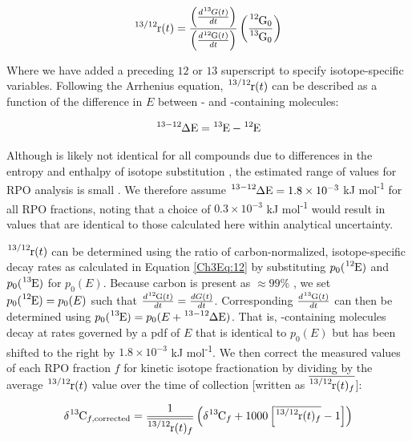 \begin{equation}\label{Ch3Eq:24}
	\ce{^{13/12}r}(t) = \frac{\left( \frac{d \ce{^{13}}G(t)}{dt} \right)}{\left( \frac{d \ce{^{12}G}(t)}{dt} \right)} \left( \frac{\ce{^{12}G}_0}{\ce{^{13}G}_0} \right)
\end{equation}

Where we have added a preceding $12$ or $13$ superscript to specify isotope-specific variables. Following the Arrhenius equation, $\ce{^{13/12}r}(t)$ can be described as a function of the difference in $E$ between - and -containing molecules:

\begin{equation}\label{Ch3Eq:25}
	\ce{^{13-12}\Delta E} = \ce{^{13}E} - \ce{^{12}E}
\end{equation}

Although  is likely not identical for all compounds due to differences in the entropy and enthalpy of isotope substitution \citep{Tang:2000ua}, the estimated range of values for RPO analysis is small \citep[$0.3 - 1.8 \times 10^{-3}$ kJ mol\textsuperscript{-1};][]{Hemingway:2016rc}. We therefore assume $\ce{^{13-12}\Delta E} = 1.8 \times 10^{-3}$ kJ mol\textsuperscript{-1} for all RPO fractions, noting that a choice of $0.3 \times 10^{-3}$ kJ mol\textsuperscript{-1} would result in  values that are identical to those calculated here within analytical uncertainty.

$\ce{^{13/12}r}(t)$ can be determined using the ratio of carbon-normalized, isotope-specific decay rates as calculated in Equation \ref{Ch3Eq:12} by substituting $p_{0}(\ce{^{12}E})$ and $p_{0}(\ce{^{13}E})$ for $p_{0}(E)$. Because carbon is present as $\approx 99$\% , we set $p_{0}(\ce{^{12}E}) = p_{0}(E)$ such that $\frac{d \ce{^{12}G}(t)}{dt} = \frac{dG(t)}{dt}$. Corresponding $\frac{d \ce{^{13}G}(t)}{dt}$ can then be determined using $p_{0}(\ce{^{13}E}) = p_{0}(E + \ce{^{13-12}\Delta E})$. That is, -containing molecules decay at rates governed by a pdf of $E$ that is identical to $p_{0}(E)$ but has been shifted to the right by $1.8 \times 10^{-3}$ kJ mol\textsuperscript{-1}. We then correct the measured  values of each RPO fraction $f$ for kinetic isotope fractionation by dividing by the average $\ce{^{13/12}r}(t)$ value over the time of collection [written as $\mean{\ce{^{13/12}r}(t)_{f}}$]:

\begin{equation}\label{Ch3Eq:26}
	\ce{\delta^{13}C}_{f, \text{corrected}} = \frac{1}{\mean{\ce{^{13/12}r}(t)_{f}}} \left( \ce{\delta^{13}C}_{f} + 1000 \left[ \mean{\ce{^{13/12}r}(t)_{f}} - 1 \right] \right)
\end{equation}


